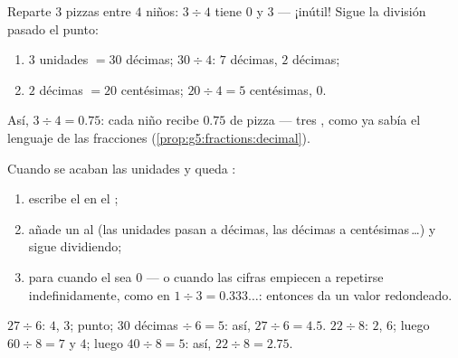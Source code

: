 \begin{example}\label{ex:g5:division:decimal}
Reparte $3$ pizzas entre $4$ niños: $3 \div 4$ tiene  $0$ y
 $3$ --- ¡inútil! Sigue la división pasado el punto:
\begin{enumerate}
  \item $3$ unidades $= 30$ décimas; $30 \div 4$: $7$ décimas, 
        $2$ décimas;
  \item $2$ décimas $= 20$ centésimas; $20 \div 4 = 5$ centésimas,
         $0$.
\end{enumerate}
Así, $3 \div 4 = 0.75$: cada niño recibe $0.75$ de pizza --- tres
, como ya sabía el lenguaje de las fracciones
(\cref{prop:g5:fractions:decimal}).
\end{example}

\begin{method}\label{met:g5:division:continue}
Cuando se acaban las unidades y queda :
\begin{enumerate}
  \item escribe el  en el ;
  \item añade un  al  (las unidades pasan a décimas, las décimas
        a centésimas\,\dots) y sigue dividiendo;
  \item para cuando el  sea $0$ --- o cuando las cifras empiecen
        a repetirse indefinidamente, como en $1 \div 3 = 0.333\dots$: entonces da un
        valor redondeado.
\end{enumerate}
\end{method}

\begin{example}\label{ex:g5:division:continue}
$27 \div 6$:  $4$,  $3$; punto; $30$ décimas
$\div\ 6 = 5$: así, $27 \div 6 = 4.5$. \quad
$22 \div 8$: $2$,  $6$; luego $60 \div 8 = 7$ y  $4$;
luego $40 \div 8 = 5$: así, $22 \div 8 = 2.75$.
\end{example}

